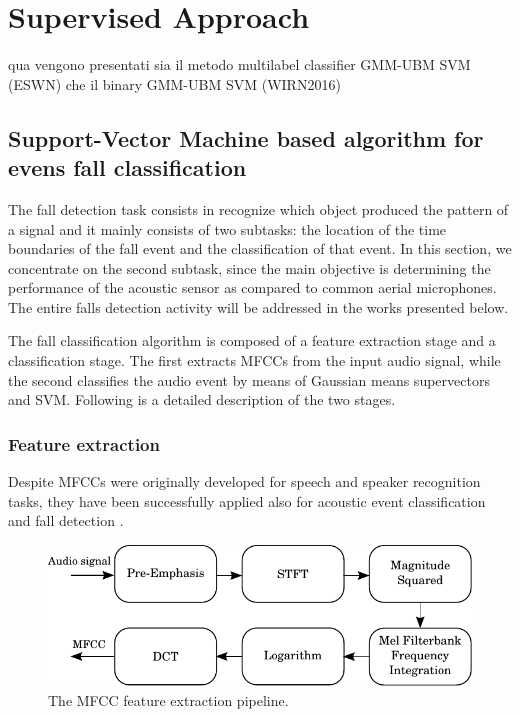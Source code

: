 \chapter{Supervised Approach}
qua vengono presentati sia il metodo multilabel classifier GMM-UBM SVM (ESWN) che 
il binary  GMM-UBM SVM (WIRN2016)



\section{Support-Vector Machine based algorithm for evens fall classification}
\label{sec:algorithm}
The fall detection task consists in recognize which object produced the pattern of a signal and it mainly consists of two subtasks: the location of the time boundaries of the fall event and the classification of that event. In this section, we concentrate on the second subtask, since the main objective is determining the performance of the acoustic sensor as compared to common aerial microphones. The entire falls detection activity will be addressed in the works presented below.

The fall classification algorithm is composed of a feature extraction stage and a classification stage. The first extracts MFCCs from the input audio signal, while the second classifies the audio event by means of Gaussian means supervectors and SVM. Following is a detailed description of the two stages.

\subsection{Feature extraction}\label{ssec:fx}
Despite MFCCs were originally developed for speech and speaker recognition tasks, they have been successfully applied also for acoustic event classification \cite{Temko2009} and fall detection \cite{zigel2009method}.

\begin{figure}[b]
	\centering
	\includegraphics[width=0.75\columnwidth]{img/mfcc_bn.pdf}
	\caption{The MFCC feature extraction pipeline.} \label{fig:mfcc}
\end{figure}

